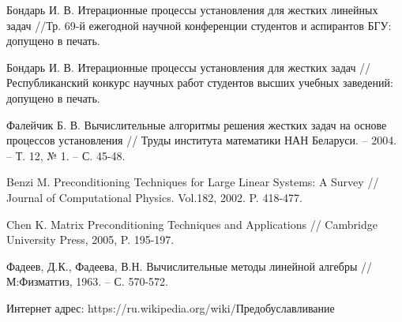 \documentclass[a4paper,14pt]{extreport}
\begin{document}
\begin{thebibliography}{99}
Бондарь И. В. Итерационные процессы установления для жестких линейных задач //Тр. 69-й ежегодной научной конференции студентов и аспирантов БГУ: допущено в печать.

Бондарь И. В. Итерационные процессы установления для жестких задач //Республиканский конкурс научных работ студентов высших учебных заведений: допущено в печать.

Фалейчик Б. В. Вычислительные алгоритмы решения жестких задач на основе процессов установления // Труды института математики НАН Беларуси. -- 2004. -- Т. 12, № 1. -- С. 45-48.

Benzi M. Preconditioning Techniques for Large Linear Systems: A Survey // Journal of Computational Physics. Vol.182, 2002. P. 418-477.

Chen K. Matrix Preconditioning Techniques and Applications // Cambridge University Press, 2005, P. 195-197.

Фадеев, Д.К., Фадеева, В.Н. Вычислительные методы линейной алгебры // М:Физматгиз, 1963. -- С. 570-572.

 Интернет адрес: https://ru.wikipedia.org/wiki/Предобуславливание
\end{thebibliography}


  \appendix
\end{document}

